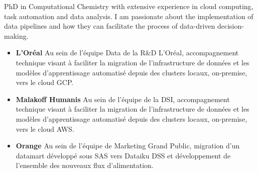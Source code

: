 \documentclass[10pt,a4paper,ragged2e,academicons]{altacv}
\begin{document}

\begin{fullwidth}
\makecvheader
\parbox{.7\paperwidth}{%
PhD in Computational Chemistry with extensive experience in cloud computing, task automation and data analysis. I am passionate about the implementation of data pipelines and how they can facilitate the process of data-driven decision-making.
}

\end{fullwidth}



\begin{itemize}
\item \textbf{L'Oréal} Au sein de l’équipe Data de la R\&D L’Oréal, accompagnement technique visant à faciliter la migration de l’infrastructure de données et les modèles d’apprentissage automatisé depuis des clusters locaux, on-premise, vers le cloud GCP.
\end{itemize}

\divider

\begin{itemize}
\item \textbf{Malakoff Humanis} Au sein de l’équipe de la DSI, accompagnement technique visant à faciliter la migration
de l’infrastructure de données et les modèles d’apprentissage automatisé depuis des
clusters locaux, on-premise, vers le cloud AWS. 
\item \textbf{Orange} Au sein de l’équipe de Marketing Grand Public, migration d’un datamart développé sous
SAS vers Dataiku DSS et développement de l’ensemble des nouveaux flux d’alimentation. 
\end{itemize}
\end{document}
